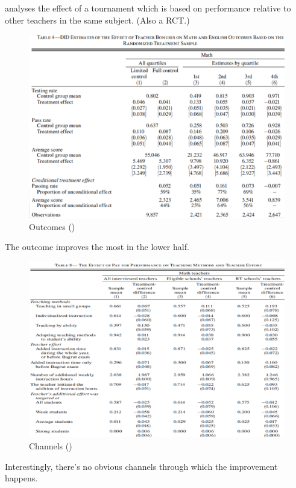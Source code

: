        \cite{lavy_performance_2009} analyses the effect of a tournament which is based on performance relative to other teachers in the same subject. (Also a RCT.)
        \begin{figure}[H]
            \centering
            \includegraphics[width=4.5in]{images/ch10/10 lavy 1.png}
            \caption{Outcomes (\cite{lavy_performance_2009})}
        \end{figure}
        The outcome improves the most in the lower half.
        \begin{figure}[H]
            \centering
            \includegraphics[width=4.5in]{images/ch10/10 lavy 2.png}
            \caption{Channels (\cite{lavy_performance_2009})}
        \end{figure}
        Interestingly, there's no obvious channels through which the improvement happens.